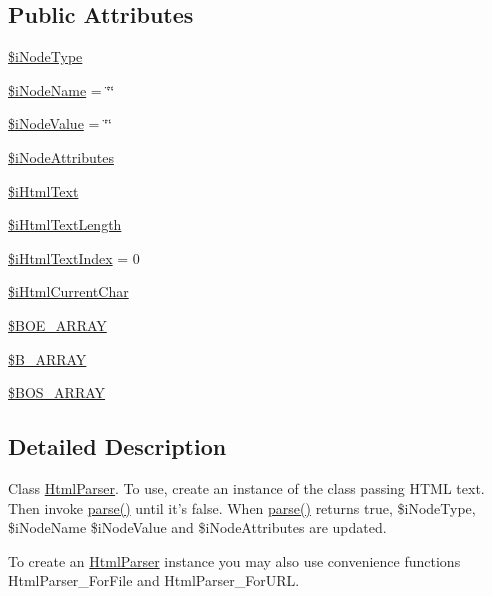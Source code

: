 \subsection*{Public Attributes}
\begin{DoxyCompactItemize}
\item 
\hyperlink{classHtmlParser_a087961848d08ffdc95f7158cf2637b12}{\$i\+Node\+Type}
\item 
\hyperlink{classHtmlParser_a1a479b30cf83744fcd8298abca4c9f5d}{\$i\+Node\+Name} = \char`\"{}\char`\"{}
\item 
\hyperlink{classHtmlParser_a7ef6690232db5f37c310d78fa4839a79}{\$i\+Node\+Value} = \char`\"{}\char`\"{}
\item 
\hyperlink{classHtmlParser_a9ad344053ffa134d3e2265c891cbc1e3}{\$i\+Node\+Attributes}
\item 
\hyperlink{classHtmlParser_af6a1ecb77e687be07113d5a9ff9b9210}{\$i\+Html\+Text}
\item 
\hyperlink{classHtmlParser_a35d1c8bba530b89ceaf92b5c56a80620}{\$i\+Html\+Text\+Length}
\item 
\hyperlink{classHtmlParser_a63c9b906ce27db18ed26d121477998fe}{\$i\+Html\+Text\+Index} = 0
\item 
\hyperlink{classHtmlParser_ac71cf9b7d83f1986b183f4224110d9e2}{\$i\+Html\+Current\+Char}
\item 
\hyperlink{classHtmlParser_af0e54c2e2a1549ef2f4f3d120dd873aa}{\$\+B\+O\+E\+\_\+\+A\+R\+R\+A\+Y}
\item 
\hyperlink{classHtmlParser_a3b2fae368ff8b36085ed6e32058c92d9}{\$\+B\+\_\+\+A\+R\+R\+A\+Y}
\item 
\hyperlink{classHtmlParser_ab8dc07c0f07d5b0903ee4ed994a75431}{\$\+B\+O\+S\+\_\+\+A\+R\+R\+A\+Y}
\end{DoxyCompactItemize}


\subsection{Detailed Description}
Class \hyperlink{classHtmlParser}{Html\+Parser}. To use, create an instance of the class passing H\+T\+M\+L text. Then invoke \hyperlink{classHtmlParser_a4856b59f41119d6c99293c94ac7f849e}{parse()} until it's false. When \hyperlink{classHtmlParser_a4856b59f41119d6c99293c94ac7f849e}{parse()} returns true, \$i\+Node\+Type, \$i\+Node\+Name \$i\+Node\+Value and \$i\+Node\+Attributes are updated.

To create an \hyperlink{classHtmlParser}{Html\+Parser} instance you may also use convenience functions Html\+Parser\+\_\+\+For\+File and Html\+Parser\+\_\+\+For\+U\+R\+L. 

